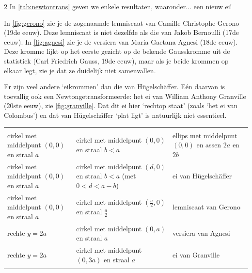 \begin{multicols}{2}
In \autoref{tab:newtontrans} geven we enkele resultaten, waaronder... een nieuw ei!

In \autoref{fig:gerono} zie je de zogenaamde lemniscaat van Camille-Christophe Gerono (19de eeuw). Deze lemniscaat is niet dezelfde als die van Jakob Bernoulli (17de eeuw). In \autoref{fig:agnesi} zie je de versiera van Maria Gaetana Agnesi (18de eeuw). Deze kromme lijkt op het eerste gezicht op de bekende Gausskromme uit de statistiek (Carl Friedrich Gauss, 19de eeuw), maar als je beide krommen op elkaar legt, zie je dat ze duidelijk niet samenvallen.

 
  
Er zijn veel andere `eikrommen' dan die van Hügelschäffer. Eén daarvan is toevallig ook een Newtongetransformeerde: het ei van William Anthony Granville (20ste eeuw), zie \autoref{fig:granville}. Dat dit ei hier `rechtop staat' (zoals `het ei van Colombus') en dat van Hügelschäffer `plat ligt' is natuurlijk niet essentieel.



\end{multicols}

\begin{tabel}
		\begin{tabular}{m{4,8cm} m{} m{}}  
			\hlinethick  %
			\tableheader{Eerste kromme} & \tableheader{Tweede kromme} & \tableheader{Newtongetransformeerde}  \\ 
			\hlinethick
			cirkel met middelpunt $(0,0)$ en straal $a$  & cirkel met middelpunt $(0,0)$ en straal $b<a$ & ellips met middelpunt $(0,0)$ en assen $2a$ en $2b$\\
			\hline
			cirkel met middelpunt $(0,0)$ en straal $a$   & cirkel met middelpunt $(d,0)$ en straal $b<a$ (met $0<d<a-b$) & ei van Hügelschäffer   \\
			\hline
			cirkel met middelpunt $(0,0)$ en straal $a$  & cirkel met middelpunt $(\frac{a}{2}, 0)$ en straal $\frac{a}{2}$ & lemniscaat van Gerono \\
			\hline
			rechte $y=2a$ & cirkel met middelpunt $(0, a)$ en straal $a$ & versiera van Agnesi  \\ 
			\hline
			rechte $y=2a$  & cirkel met middelpunt $(0, 3a)$ en straal $a$ & ei van Granville \\
			\hlinethick
		\end{tabular}
		\caption{Enkele Newtongetransformeerden}\label{tab:newtontrans}
	\end{tabel}
	

